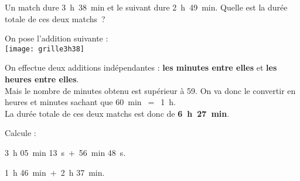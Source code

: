 \begin{methode*1}

\begin{exemple*1}
Un match dure 3 h 38 min et le suivant dure 2 h 49 min. Quelle est la durée totale de ces deux matchs ? \\[1em]
\begin{minipage}[t]{.34\textwidth}
On pose l'addition suivante :\\[0.2em]

\texttt{[image: grille3h38]}
\end{minipage}\hfill%
\begin{minipage}[t]{.60\textwidth}
On effectue deux additions indépendantes : 
\textcolor{vert}{\textbf{les minutes entre elles}} et \textcolor{bleu}{\textbf{les heures entre elles}}.\\[0.75em]
Mais le nombre de minutes obtenu est supérieur à 59. 
On va donc le convertir en heures et minutes sachant que 60 min $=$ 1 h. \\[0.75em]
La durée totale de ces deux matchs est donc de \textcolor{rose}{\textbf{6 h 27 min}}.
\end{minipage}

\end{exemple*1}

\exercice

Calcule :

3 h 05 min 13 s $+$ 56 min 48 s.

\vspace{1em}

1 h 46 min $+$ 2 h 37 min.

\end{methode*1}


